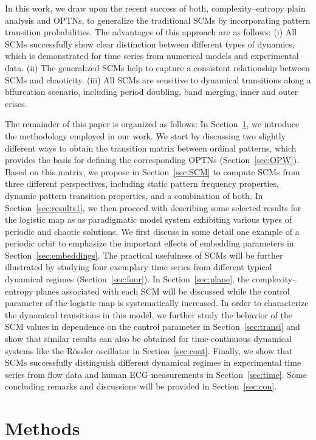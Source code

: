 \documentclass[12pt,aip,cha,reprint,nofootinbib]{revtex4-1}
\begin{document}
In this work, we draw upon the recent success of both, complexity--entropy plain analysis and OPTNs, to generalize the traditional SCMs by incorporating pattern transition probabilities. The advantages of this approach are as follows: (i) All SCMs successfully show clear distinction between different types of dynamics, which is demonstrated for time series from numerical models and experimental data. (ii) The generalized SCMs help to capture a consistent relationship between SCMs and chaoticity. (iii) All SCMs are sensitive to dynamical transitions along a bifurcation scenario, including period doubling, band merging, inner and outer crises. 

The remainder of this paper is organized as follows: In Section~\ref{sec:methods}, we introduce the methodology employed in our work. We start by discussing two slightly different ways to obtain the transition matrix between ordinal patterns, which provides the basis for defining the corresponding OPTNs (Section~\ref{sec:OPW}). Based on this matrix, we propose in Section~\ref{sec:SCM} to compute SCMs from three different perspectives, including static pattern frequency properties, dynamic pattern transition properties, and a combination of both. In Section~\ref{sec:results1}, we then proceed with describing some selected results for the logistic map as as paradigmatic model system exhibiting various types of periodic and chaotic solutions. We first discuss in some detail one example of a periodic orbit to emphasize the important effects of embedding parameters in Section~\ref{sec:embeddings}. The practical usefulness of SCMs will be further illustrated by studying four exemplary time series from different typical dynamical regimes (Section~\ref{sec:four}). In Section~\ref{sec:plane}, the complexity--entropy planes associated with each SCM will be discussed while the control parameter of the logistic map is systematically increased. In order to characterize the dynamical transitions in this model, we further study the behavior of the SCM values in dependence on the control parameter in Section~\ref{sec:transi} and show that similar results can also be obtained for time-continuous dynamical systems like the R\"ossler oscillator in Section~\ref{sec:cont}. Finally, we show that SCMs successfully distinguish different dynamical regimes in experimental time series from flow data and human ECG measurements in Section~\ref{sec:time}. Some concluding remarks and discussions will be provided in Section~\ref{sec:con}.  

\section{Methods} \label{sec:methods}
\end{document}
